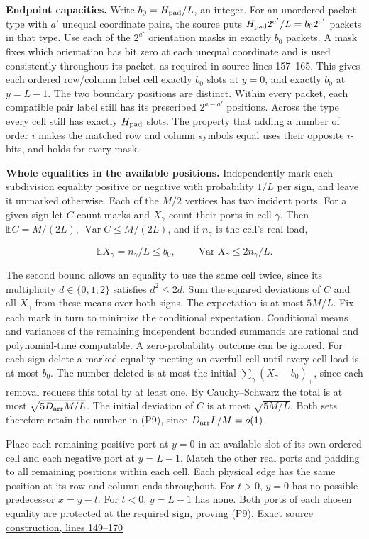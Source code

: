 \documentclass[
  11pt,
]{article}
\begin{document}
\textbf{Endpoint capacities.} Write \(b_0=H_{\rm pad}/L\), an integer.
For an unordered packet type with \(a'\) unequal coordinate pairs, the
source puts \(H_{\rm pad}2^{a'}/L=b_0 2^{a'}\) packets in that type. Use
each of the \(2^{a'}\) orientation masks in exactly \(b_0\) packets. A
mask fixes which orientation has bit zero at each unequal coordinate and
is used consistently throughout its packet, as required in source lines
157--165. This gives each ordered row/column label cell exactly \(b_0\)
slots at \(y=0\), and exactly \(b_0\) at \(y=L-1\). The two boundary
positions are distinct. Within every packet, each compatible pair label
still has its prescribed \(2^{a-a'}\) positions. Across the type every
cell still has exactly \(H_{\rm pad}\) slots. The property that adding a
number of order \(i\) makes the matched row and column symbols equal
uses their opposite \(i\)-bits, and holds for every mask.

\textbf{Whole equalities in the available positions.} Independently mark
each subdivision equality positive or negative with probability \(1/L\)
per sign, and leave it unmarked otherwise. Each of the \(M/2\) vertices
has two incident ports. For a given sign let \(C\) count marks and
\(X_\gamma\) count their ports in cell \(\gamma\). Then
\(\mathbb EC=M/(2L)\), \(\operatorname{Var}C\le M/(2L)\), and if
\(n_\gamma\) is the cell's real load,

\[
 \mathbb EX_\gamma=n_\gamma/L\le b_0,\qquad
 \operatorname{Var}X_\gamma\le 2n_\gamma/L .
\]

The second bound allows an equality to use the same cell twice, since
its multiplicity \(d\in\{0,1,2\}\) satisfies \(d^2\le2d\). Sum the
squared deviations of \(C\) and all \(X_\gamma\) from these means over
both signs. The expectation is at most \(5M/L\). Fix each mark in turn
to minimize the conditional expectation. Conditional means and variances
of the remaining independent bounded summands are rational and
polynomial-time computable. A zero-probability outcome can be ignored.
For each sign delete a marked equality meeting an overfull cell until
every cell load is at most \(b_0\). The number deleted is at most the
initial \(\sum_\gamma(X_\gamma-b_0)_+\), since each removal reduces this
total by at least one. By Cauchy--Schwarz the total is at most
\(\sqrt{5D_{\rm arr}M/L}\). The initial deviation of \(C\) is at most
\(\sqrt{5M/L}\). Both sets therefore retain the number in (P9), since
\(D_{\rm arr}L/M=o(1)\).

Place each remaining positive port at \(y=0\) in an available slot of
its own ordered cell and each negative port at \(y=L-1\). Match the
other real ports and padding to all remaining positions within each
cell. Each physical edge has the same position at its row and column
ends throughout. For \(t>0\), \(y=0\) has no possible predecessor
\(x=y-t\). For \(t<0\), \(y=L-1\) has none. Both ports of each chosen
equality are protected at the required sign, proving (P9).
\href{https://github.com/openai/math/blob/main/preprints/The-Exponential-Time-Hypothesis-is-False-October-25-2026/build/quantitative-contraction.tex\#L149}{Exact
source construction, lines 149--170}
\end{document}
